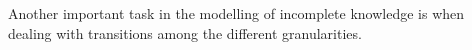 Another important task in the modelling of incomplete knowledge is when dealing with transitions among the different granularities.







%
%
